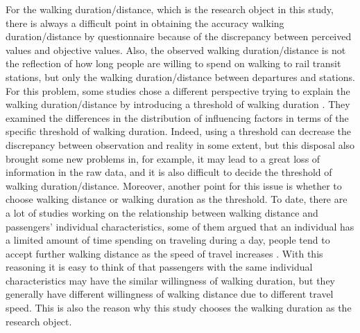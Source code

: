 %
For the walking duration/distance, which is the research object in this study, there is always a difficult point in obtaining the accuracy walking duration/distance by questionnaire because of the discrepancy between perceived values and objective values. Also, the observed walking duration/distance is not the reflection of how long people are willing to spend on walking to rail transit stations, but only the walking duration/distance between departures and stations. For this problem, some studies chose a different perspective trying to explain the walking duration/distance by introducing a threshold of walking duration \cite{besser2005walking,mccormack2008objective}. They examined the differences in the distribution of influencing factors in terms of the specific threshold of walking duration. Indeed, using a threshold can decrease the discrepancy between observation and reality in some extent, but this disposal also brought some new problems in, for example, it may lead to a great loss of information in the raw data, and it is also difficult to decide the threshold of walking duration/distance. Moreover, another point for this issue is whether to choose walking distance or walking duration as the threshold. To date, there are a lot of studies working on the relationship between walking distance and passengers' individual characteristics, some of them argued that an individual has a limited amount of time spending on traveling during a day, people tend to accept further walking distance as the speed of travel increases \cite{marchetti1994anthropological,larsen2010beyond}. With this reasoning it is easy to think of that passengers with the same individual characteristics may have the similar willingness of walking duration, but they generally have different willingness of walking distance due to different travel speed. This is also the reason why this study chooses the walking duration as the research object.

